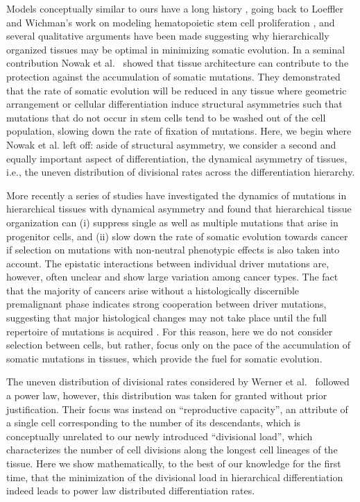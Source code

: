\documentclass[aps,singlecolumn]{revtex4-1}
\begin{document}

Models conceptually similar to ours have a long history
\cite{Loeffler:1980,Nowak:2003,Takizawa:2011sf,Pepper:2007,Werner:2011,Werner:2013,Werner:2015},
going back to Loeffler and Wichman's work on modeling
hematopoietic stem cell proliferation \cite{Loeffler:1980},
and several qualitative arguments have been made suggesting why
hierarchically organized tissues may be optimal in minimizing somatic
evolution. In a seminal contribution Nowak et al.\ \cite{Nowak:2003}
showed that tissue architecture
can contribute to the protection against the accumulation of somatic
mutations. They demonstrated that the rate of somatic evolution will be
reduced in any tissue where geometric arrangement or cellular
differentiation induce structural asymmetries such that mutations that
do not occur in stem cells tend to be washed out of the cell
population, slowing down the rate of fixation of mutations.
Here, we begin where Nowak et al. \cite{Nowak:2003} left off: aside of
structural asymmetry, we consider a
second and equally important aspect of differentiation, the dynamical
asymmetry of tissues, i.e., the uneven distribution of divisional rates
across the differentiation hierarchy.

More recently a series of studies have investigated the
dynamics of mutations in hierarchical tissues with dynamical
asymmetry \cite{Pepper:2007,Werner:2011,Werner:2013}
and found that hierarchical tissue organization can
(i) suppress single \cite{Werner:2011} as well as multiple mutations
\cite{Werner:2013} that arise in progenitor cells, and
(ii) slow down the rate of somatic evolution towards cancer
\cite{Pepper:2007} if selection on mutations with
non-neutral phenotypic effects is also taken into account.
%
The epistatic interactions between individual driver mutations are,
however, often unclear and show large variation among cancer types.
The fact that the majority of cancers arise without a histologically
discernible premalignant phase indicates strong cooperation between
driver mutations, suggesting that major histological changes may not
take place until the full repertoire of mutations is acquired
\cite{Martincorena:2015rev}. For this reason, here we do not consider
selection between cells, but rather, focus only on the pace of the
accumulation of somatic mutations in tissues, which provide the fuel
for somatic evolution.

The uneven distribution of divisional rates considered by Werner et al.\
\cite{Werner:2011,Werner:2013}
followed a power law, however, this distribution was taken
for granted without prior justification. Their focus was instead on
``reproductive capacity'', an attribute of a single cell corresponding
to the number of its descendants, which is conceptually unrelated to
our newly introduced ``divisional load'', which characterizes the
number of cell divisions along the longest cell lineages of the tissue.
Here we show mathematically, to the best of our knowledge for the first
time, that the minimization of the divisional load in hierarchical
differentiation indeed leads to power law distributed differentiation
rates.
\end{document}
